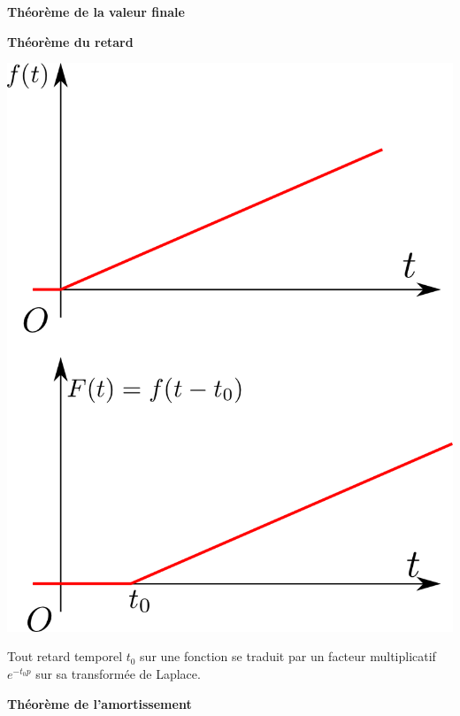 \documentclass[10pt,fleqn]{article} %
\begin{document}
\begin{theorem}
\textbf{Théorème de la valeur finale}

\end{theorem}

\begin{minipage}[c]{.6\linewidth}
\begin{theorem}
\textbf{Théorème du retard}

\end{theorem}
\end{minipage} \hfill
\begin{minipage}[c]{.35\linewidth}

\begin{center}
 \includegraphics[width=.25\textwidth]{images/retard}
\end{center}
\end{minipage}

Tout retard temporel $t_0$ sur une fonction se traduit par un facteur
multiplicatif $e^{-t_0 p}$ sur sa transformée de Laplace.


\begin{minipage}[c]{.6\linewidth}
\begin{theorem}
\textbf{Théorème de l'amortissement}

\end{theorem}
\end{minipage} \hfill
\begin{minipage}[c]{.35\linewidth}
\end{minipage}
\end{document}
